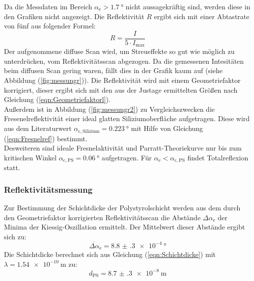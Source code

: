\FloatBarrier
\noindent Da die Messdaten im Bereich $\alpha_\mathrm{e} > \SI{1.7}{\degree}$ nicht aussagekräftig sind, werden diese in den Grafiken nicht angezeigt. Die Reflektivität $R$ ergibt sich mit einer Abtastrate von fünf aus folgender Formel:
\begin{equation}
  R=\dfrac{I}{5\cdot I_\mathrm{max}}
\end{equation}
Der aufgenommene diffuse Scan wird, um Streueffekte so gut wie möglich zu unterdrücken, vom Reflektivitätsscan abgezogen. Da die gemessenen Intesitäten beim diffusen Scan gering waren, fällt
dies in der Grafik kaum auf (siehe Abbildung (\ref{fig:messungr})). Die Reflektivität wird mit einem Geometriefaktor korrigiert, dieser ergibt sich mit den aus der Justage ermittelten Größen nach Gleichung (\ref{eqn:Geometriefaktorl}). \\
Außerdem ist in Abbildung (\ref{fig:messungr2}) zu Vergleichszwecken die Fresenelreflektivität einer ideal glatten Siliziumoberfläche aufgetragen.
Diese wird aus dem Literaturwert \cite[5]{Anleitung3} $\alpha_\mathrm{c,Silizium} = \SI{0.223}{\degree}$ mit Hilfe von Gleichung (\ref{eqn:Fresnelref}) bestimmt. \\
Desweiteren sind ideale Fresnelaktivität und Parratt-Theoriekurve nur bis zum kritischen Winkel $\alpha_\mathrm{c,PS}=\SI{0.06}{\degree}$ aufgetragen. Für $\alpha_\mathrm{e}<\alpha_\mathrm{c,PS}$ findet Totalreflexion statt.
\subsubsection{Reflektivitätsmessung}
Zur Bestimmung der Schichtdicke der Polystyrolschicht werden aus dem durch den Geometriefaktor korrigierten Reflektivitätsscan die Abstände $\Delta\alpha_\mathrm{e}$ der Minima der Kiessig-Oszillation
ermittelt. Der Mittelwert dieser Abstände ergibt sich zu:
\begin{equation}
  \overline{\Delta\alpha}_\mathrm{e} = \SI{8.8(3) e-4}{\degree}
\end{equation}
Die Schichtdicke berechnet sich aus Gleichung (\ref{eqn:Schichtdicke}) mit $\lambda=\SI{1.54 e-10}{\meter}$ zu:
\begin{equation*}
  d_\mathrm{PS}=\SI{8.7(3) e-8}{\meter}
\end{equation*}
